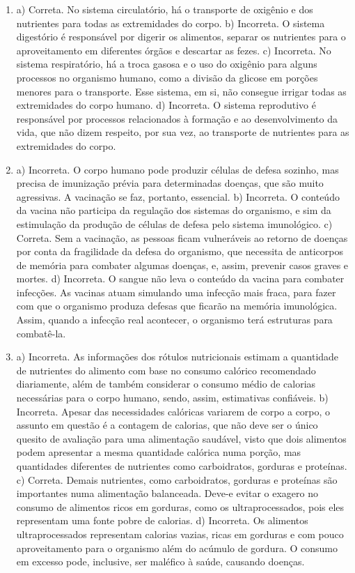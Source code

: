 \begin{enumerate}
\item
a) Correta. No sistema circulatório, há o transporte de oxigênio e dos
nutrientes para todas as extremidades do corpo.
b) Incorreta. O sistema digestório é responsável por digerir os
alimentos, separar os nutrientes para o aproveitamento em diferentes
órgãos e descartar as fezes.
c) Incorreta. No sistema respiratório, há a troca gasosa e o uso do
oxigênio para alguns processos no organismo humano, como a divisão da
glicose em porções menores para o transporte. Esse sistema, em si, não
consegue irrigar todas as extremidades do corpo humano.
d) Incorreta. O sistema reprodutivo é responsável por processos relacionados
à formação e ao desenvolvimento da vida, que não dizem respeito, por sua 
vez, ao transporte de nutrientes para as extremidades do corpo.

\item
a) Incorreta. O corpo humano pode produzir células de defesa sozinho, mas
precisa de imunização prévia para determinadas doenças, que são muito agressivas.
A vacinação se faz, portanto, essencial.
b) Incorreta. O conteúdo da vacina não participa da regulação dos sistemas do
organismo, e sim da estimulação da produção de células de defesa pelo sistema
imunológico.
c) Correta. Sem a vacinação, as pessoas ficam vulneráveis ao retorno de
doenças por conta da fragilidade da defesa do organismo, que necessita
de anticorpos de memória para combater algumas doenças, e, assim, prevenir
casos graves e mortes.
d) Incorreta. O sangue não leva o conteúdo da vacina para combater
infecções. As vacinas atuam simulando uma infecção mais fraca, para
fazer com que o organismo produza defesas que ficarão na memória
imunológica. Assim, quando a infecção real acontecer, o organismo terá
estruturas para combatê-la.

\item
a) Incorreta. As informações dos rótulos nutricionais estimam a
quantidade de nutrientes do alimento com base no consumo calórico
recomendado diariamente, além de também considerar o consumo médio de
calorias necessárias para o corpo humano, sendo, assim, estimativas
confiáveis.
b) Incorreta. Apesar das necessidades calóricas variarem de corpo a
corpo, o assunto em questão é a contagem de calorias, que não deve ser o
único quesito de avaliação para uma alimentação saudável, visto que dois
alimentos podem apresentar a mesma quantidade calórica numa porção, mas
quantidades diferentes de nutrientes como carboidratos, gorduras e
proteínas.
c) Correta. Demais nutrientes, como carboidratos, gorduras e proteínas
são importantes numa alimentação balanceada. Deve-e evitar o exagero no
consumo de alimentos ricos em gorduras, como os ultraprocessados, pois
eles representam uma fonte pobre de calorias.
d) Incorreta. Os alimentos ultraprocessados representam calorias vazias,
ricas em gorduras e com pouco aproveitamento para o organismo além do
acúmulo de gordura. O consumo em excesso pode, inclusive, ser maléfico à
saúde, causando doenças.
\end{enumerate}

